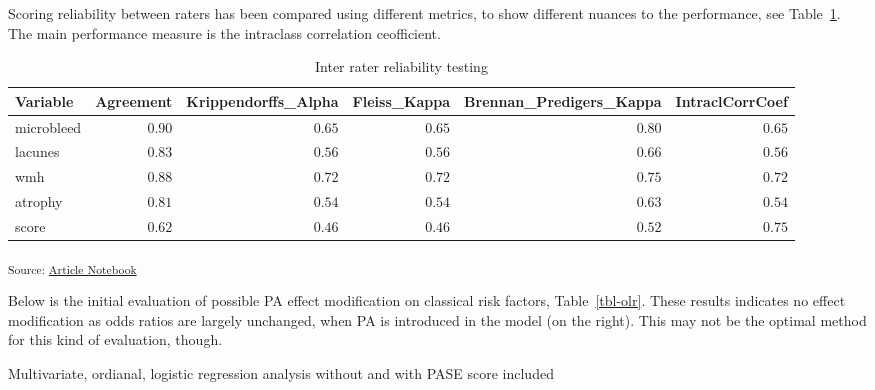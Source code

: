 \documentclass[
  letterpaper,
  DIV=11,
  numbers=noendperiod]{scrartcl}
\begin{document}
Scoring reliability between raters has been compared using different
metrics, to show different nuances to the performance, see
Table~\ref{tbl-irr}. The main performance measure is the intraclass
correlation ceofficient.

\begin{longtable}{lrrrrr}

\caption{\label{tbl-irr}Inter rater reliability testing}

\tabularnewline

\toprule
Variable & Agreement & Krippendorffs\_Alpha & Fleiss\_Kappa & Brennan\_Predigers\_Kappa & IntraclCorrCoef \\ 
\midrule\addlinespace[2.5pt]
microbleed & $0.90$ & $0.65$ & $0.65$ & $0.80$ & $0.65$ \\ 
lacunes & $0.83$ & $0.56$ & $0.56$ & $0.66$ & $0.56$ \\ 
wmh & $0.88$ & $0.72$ & $0.72$ & $0.75$ & $0.72$ \\ 
atrophy & $0.81$ & $0.54$ & $0.54$ & $0.63$ & $0.54$ \\ 
score & $0.62$ & $0.46$ & $0.46$ & $0.52$ & $0.75$ \\ 
\bottomrule

\end{longtable}

\textsubscript{Source:
\href{https://agdamsbo.github.io/svd-modification/index.qmd.html}{Article
Notebook}}

Below is the initial evaluation of possible PA effect modification on
classical risk factors, Table~\ref{tbl-olr}. These results indicates no
effect modification as odds ratios are largely unchanged, when PA is
introduced in the model (on the right). This may not be the optimal
method for this kind of evaluation, though.

\begin{table}

\caption{\label{tbl-olr}Multivariate, ordianal, logistic regression
analysis without and with PASE score included}


\end{table}%
\end{document}
